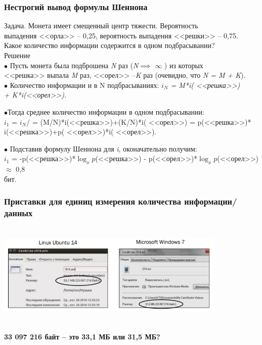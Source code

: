 \documentclass[10pt]{beamer}
\begin{document}
	\begin{frame}
		\frametitle {{\color{blue}Н}естрогий вывод формулы Шеннона}
		{\color{green}Задача}. Монета имеет смещенный центр тяжести. Вероятность \\
		выпадения <<орла>> -- 0,25, вероятность выпадения <<решки>> -- 0,75. \\
		Какое количество информации содержится в одном подбрасывании?\\
		\vspace{0.5cm}
		{\color{green}Решение}\\
		\small $\bullet$ \quad Пусть монета была подброшена \textit{N}  раз (\textit{N}$\implies$ $\infty$  ) из которых\\
		 \qquad <<решка>> выпала \textit{M} раз, <<орел>> --\textit{K} раз (очевидно, что \textit{N = M + K}).\\

		$\bullet$ \quad Количество информации и в N подбрасываниях: \textit{$i_N$ = M*i( <<решка>>)\\
		\qquad + K*i(<<орел>>)}.

		$\bullet$\quad Тогда среднее количество информации в одном подбрасывании:\\
		\qquad $i_1$ = $i_N$/ = (M/N)*i(<<решка>>)+(K/N)*i( <<орел>>) = p(<<решка>>)*\\
		\qquad *i(<<решка>>)+p( <<орел>>)*i( <<орел>>).

		$\bullet$ \quad Подставив формулу Шеннона для \textit{i}, оконачательно получим:\\
		\qquad $i_1$ = -p(<<решка>>)*$\log_xp$(<<решка>>) - p(<<орел>>)*$\log_xp$(<<орел>>) $\approx$ 0,8\\
		\qquad бит.
	\end{frame}
	\begin{frame}
		\frametitle {{\small \color{blue} П}\small риставки для единиц измерения количества информации/данных}
		\includegraphics[width=11cm, height=5cm]{present_1.png}\\
	\begin{center}
		\textbf{ 33 097 216 байт -- это {\color{green}33,1} МБ или {\color{green}31,5} МБ?}
	\end{center}

	\end{frame}
\end{document}
